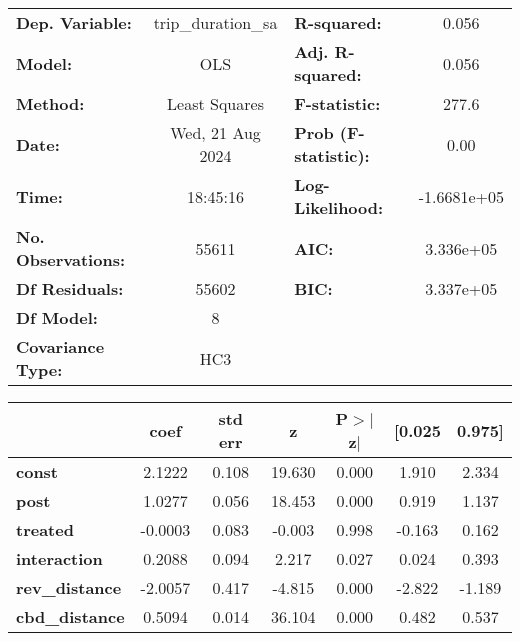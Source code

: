 \begin{center}
\begin{tabular}{lclc}
\toprule
\textbf{Dep. Variable:}    & trip\_duration\_sa & \textbf{  R-squared:         } &      0.056   \\
\textbf{Model:}            &        OLS         & \textbf{  Adj. R-squared:    } &      0.056   \\
\textbf{Method:}           &   Least Squares    & \textbf{  F-statistic:       } &      277.6   \\
\textbf{Date:}             &  Wed, 21 Aug 2024  & \textbf{  Prob (F-statistic):} &      0.00    \\
\textbf{Time:}             &      18:45:16      & \textbf{  Log-Likelihood:    } & -1.6681e+05  \\
\textbf{No. Observations:} &        55611       & \textbf{  AIC:               } &  3.336e+05   \\
\textbf{Df Residuals:}     &        55602       & \textbf{  BIC:               } &  3.337e+05   \\
\textbf{Df Model:}         &            8       & \textbf{                     } &              \\
\textbf{Covariance Type:}  &        HC3         & \textbf{                     } &              \\
\bottomrule
\end{tabular}
\begin{tabular}{lcccccc}
                       & \textbf{coef} & \textbf{std err} & \textbf{z} & \textbf{P$> |$z$|$} & \textbf{[0.025} & \textbf{0.975]}  \\
\midrule
\textbf{const}         &       2.1222  &        0.108     &    19.630  &         0.000        &        1.910    &        2.334     \\
\textbf{post}          &       1.0277  &        0.056     &    18.453  &         0.000        &        0.919    &        1.137     \\
\textbf{treated}       &      -0.0003  &        0.083     &    -0.003  &         0.998        &       -0.163    &        0.162     \\
\textbf{interaction}   &       0.2088  &        0.094     &     2.217  &         0.027        &        0.024    &        0.393     \\
\textbf{rev\_distance} &      -2.0057  &        0.417     &    -4.815  &         0.000        &       -2.822    &       -1.189     \\
\textbf{cbd\_distance} &       0.5094  &        0.014     &    36.104  &         0.000        &        0.482    &        0.537     \\

\end{tabular}
\end{center}
